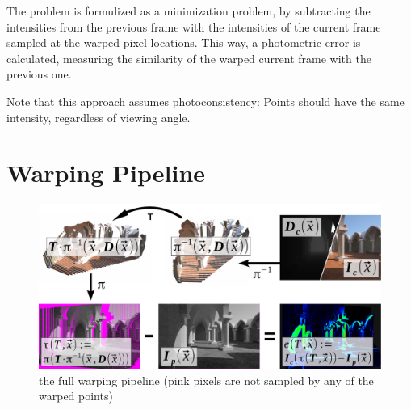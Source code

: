 The problem is formulized as a minimization problem, by subtracting the
intensities from the previous frame with the intensities of the current frame
sampled at the warped pixel locations. This way, a photometric error is
calculated, measuring the similarity of the warped current frame with the
previous one.

Note that this approach assumes photoconsistency: Points should have the same
intensity, regardless of viewing angle.


\section{Warping Pipeline}

\begin{figure}[h]
    \centering
    \includegraphics[width=\textwidth]{images/warp_pipeline.pdf}
    \caption{the full warping pipeline (pink pixels are not sampled by any of the warped points)}
    \label{fig:warp_pipeline}
\end{figure}

